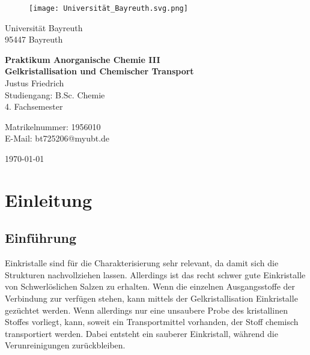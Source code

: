 \documentclass[12pt, a4paper]{article}
\begin{document}
\begin{figure}
    \texttt{[image: Universität\_Bayreuth.svg.png]}
\end{figure}



{\raggedright Universität Bayreuth\\  95447 Bayreuth}


\vspace{5cm}

\begin{center}
{\LARGE\bf{Praktikum Anorganische Chemie III}} \\  
\vspace{1cm}
{\Large\bf{Gelkristallisation und Chemischer Transport}}\\
\vspace{0.5cm}
{\large Justus Friedrich\\}
{Studiengang: B.Sc. Chemie\\}
{4. Fachsemester}
\end{center}





\thispagestyle{empty}
\begin{center}
{\small Matrikelnummer: 1956010 \\
E-Mail:  bt725206@myubt.de}
\end{center}

\vspace{5cm}
\begin{center}
  \today
\end{center}



\newpage
\tableofcontents
\thispagestyle{empty}


\newpage
\setcounter{page}{1}
\section{Einleitung}



\subsection{Einführung}
{Einkristalle sind für die Charakterisierung sehr relevant, da damit sich die Strukturen nachvollziehen lassen. Allerdings ist das recht 
schwer gute Einkristalle von Schwerlöslichen Salzen zu erhalten. Wenn die einzelnen Ausgangsstoffe der Verbindung zur verfügen stehen, kann mittels 
der Gelkristallisation Einkristalle gezüchtet werden. Wenn allerdings nur eine unsaubere Probe des kristallinen Stoffes vorliegt, kann, soweit ein Transportmittel vorhanden, 
der Stoff chemisch transportiert werden. Dabei entsteht ein sauberer Einkristall, während die Verunreinigungen zurückbleiben.
}
\end{document}
